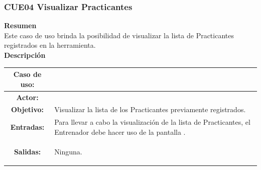 \subsubsection{CUE04 Visualizar Practicantes}
\label{cu:CUE04}

\textbf{\textcolor[rgb]{0, 0, 0.545098}{Resumen}} \\

Este caso de uso brinda la posibilidad de visualizar la lista de Practicantes registrados en la herramienta.\\

\textbf{\textcolor[rgb]{0, 0, 0.545098}{Descripción}} \\

\begin{table}[H]
\centering
\begin{tabular}{| c | p{12 cm} |}
\hline
\rowcolor[rgb]{0.529412, 0.807843, 0.980392} {\textbf{Caso de uso:}} & \hspace{7em}{\textbf{CUE04 Visualizar Practicantes}}\\
\hline
\textbf{Actor:} &  \nameref{act:Entrenador} \\
\hline
\textbf{Objetivo:} & Visualizar la lista de los Practicantes previamente registrados.\\
\hline
\textbf{Entradas:} & Para llevar a cabo la visualización de la lista de Practicantes, el Entrenador debe hacer uso de la pantalla \nameref{pant:IUE04}.\\
\hline
\textbf{Salidas:} & \vspace{-2mm}	%
					\begin{compactitem}
						\setlength\itemsep{-0.25em}
						\item Ninguna.
					\end{compactitem}\\


\end{tabular}
\end{table}
